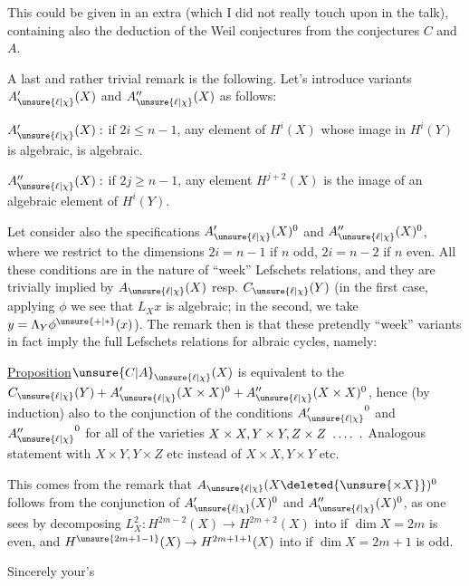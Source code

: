 
This could be given in an extra  (which I did not really touch upon in the talk), containing also the deduction of the Weil conjectures from the conjectures $C$ and $A$.

A last and rather trivial remark is the following. Let's introduce  variants $A'_{\unsure{\ell|\chi}}(X)$ and $A''_{\unsure{\ell|\chi}}(X)$ as follows:

$A'_{\unsure{\ell|\chi}}(X):$ if $2i\leq n-1$, any element  of $H^i(X)$ whose image in $H^i(Y)$ is algebraic, is algebraic.

$A''_{\unsure{\ell|\chi}}(X):$ if $2j\geq n-1$, any  element   $H^{j+2}(X)$ is  the image of an algebraic element of $H^i(Y)$.

Let  consider also the specifications $A'_{\unsure{\ell|\chi}}(X)^0$ and $A''_{\unsure{\ell|\chi}}(X)^0$, where we restrict to the  dimensions $2i=n-1$ if $n$ odd, $2i=n-2$ if $n$ even. All these conditions are in the nature of ``week'' Lefschets relations, and they are trivially implied by $A_{\unsure{\ell|\chi}}(X)$ resp. $C_{\unsure{\ell|\chi}}(Y)$ (in the first case, applying $\phi$ we see that $L_Xx$ is algebraic; in the second, we take $y=\Lambda_Y\phi^{\unsure{+|*}}(x)$). The remark then is that these pretendly ``week'' variants in fact imply the full Lefschets relations for albraic cycles, namely:

\uline{Proposition}\quad $\unsure{C|A}_{\unsure{\ell|\chi}}(X)$ is equivalent to the  $C_{\unsure{\ell|\chi}}(Y)+A'_{\unsure{\ell|\chi}}(X\times X)^0+A''_{\unsure{\ell|\chi}}(X\times X)^0$, hence (by induction) also to the conjunction of the conditions ${A'_{\unsure{\ell|\chi}}}^0$ and ${A''_{\unsure{\ell|\chi}}}^0$ for all of the varieties $X\times X,Y\times Y,Z\times Z\ \mathinner{\ldotp\ldotp\ldotp\ldotp}\ .$ Analogous statement with $X\times Y,Y\times Z$ etc instead of $X\times X,Y\times Y$ etc.

This comes from the remark that  $A_{\unsure{\ell|\chi}}(X\deleted{\unsure{\times X}})^0$ follows from the conjunction of $A'_{\unsure{\ell|\chi}}(X)^0$ and $A''_{\unsure{\ell|\chi}}(X)^0$, as one sees by decomposing $L_X^2:H^{2m-2}(X)\to H^{2m+2}(X)$ into
if $\dim X=2m$ is even, and $H^{\unsure{2m+1-1}}(X)\to H^{2m+1+1}(X)$ into
if $\dim X=2m+1$ is odd.

Sincerely your's

